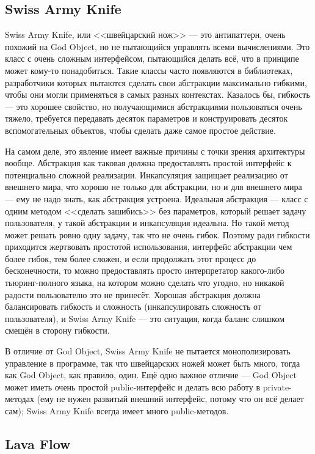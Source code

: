\documentclass{../../text-style}
\begin{document}
\subsection{Swiss Army Knife}

Swiss Army Knife, или <<швейцарский нож>> --- это антипаттерн, очень похожий на God Object, но не пытающийся управлять всеми вычислениями. Это класс с очень сложным интерфейсом, пытающийся делать всё, что в принципе может кому-то понадобиться. Такие классы часто появляются в библиотеках, разработчики которых пытаются сделать свои абстракции максимально гибкими, чтобы они могли применяться в самых разных контекстах. Казалось бы, гибкость --- это хорошее свойство, но получающимися абстракциями пользоваться очень тяжело, требуется передавать десяток параметров и конструировать десяток вспомогательных объектов, чтобы сделать даже самое простое действие.

На самом деле, это явление имеет важные причины с точки зрения архитектуры вообще. Абстракция как таковая должна предоставлять простой интерфейс к потенциально сложной реализации. Инкапсуляция защищает реализацию от внешнего мира, что хорошо не только для абстракции, но и для внешнего мира --- ему не надо знать, как абстракция устроена. Идеальная абстракция --- класс с одним методом <<сделать зашибись>> без параметров, который решает задачу пользователя, у такой абстракции и инкапсуляция идеальна. Но такой метод может решать ровно одну задачу, так что не очень гибок. Поэтому ради гибкости приходится жертвовать простотой использования, интерфейс абстракции чем более гибок, тем более сложен, и если продолжать этот процесс до бесконечности, то можно предоставлять просто интерпретатор какого-либо тьюринг-полного языка, на котором можно сделать что угодно, но никакой радости пользователю это не принесёт. Хорошая абстракция должна балансировать гибкость и сложность (инкапсулировать сложность от пользователя), и Swiss Army Knife --- это ситуация, когда баланс слишком смещён в сторону гибкости.

В отличие от God Object, Swiss Army Knife не пытается монополизировать управление в программе, так что швейцарских ножей может быть много, тогда как God Object, как правило, один. Ещё одно важное отличие --- God Object может иметь очень простой public-интерфейс и делать всю работу в private-методах (ему не нужен развитый внешний интерфейс, потому что он всё делает сам); Swiss Army Knife всегда имеет много public-методов.

\subsection{Lava Flow}
\end{document}
